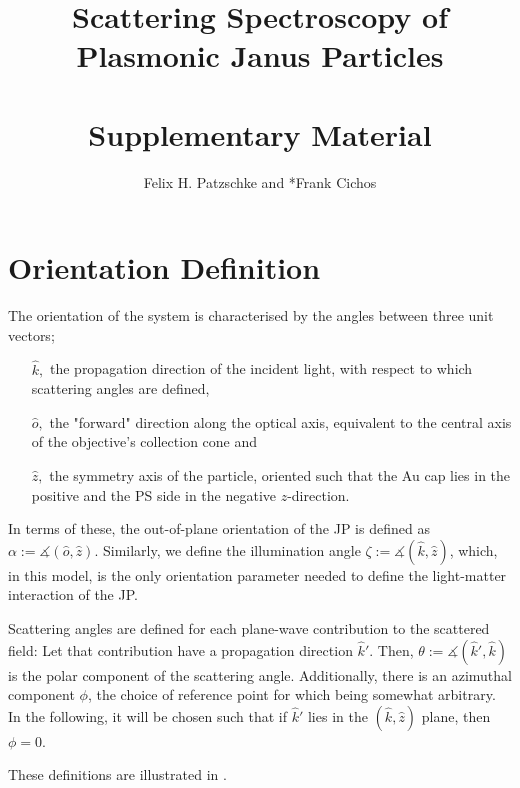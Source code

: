 \documentclass[10pt]{article}
\title{\sffamily\bfseries\color{MidnightBlue} Scattering Spectroscopy of\\Plasmonic Janus Particles\\\mbox{ }\\Supplementary Material}
\author{Felix H. Patzschke and *Frank Cichos}
\date{}
\newcommand{\reffig}[2]{\mbox{\sffamily{Figure \ref{#1}#2}}}
\begin{document}

\maketitle

\sectionfont{\sffamily\color{MidnightBlue}}  %
\subsectionfont{\sffamily\color{MidnightBlue}}  %



\section*{Orientation Definition}
The orientation of the system is characterised by the angles between three unit vectors;
\begin{itemize}
    \item[$\hat{k},$] the propagation direction of the incident light, with respect to which scattering angles are defined, 
    \item[$\hat{o},$] the "forward" direction along the optical axis, equivalent to the central axis of the objective's collection cone and
    \item[$\hat{z},$] the symmetry axis of the particle, oriented such that the Au cap lies in the positive and the PS side in the negative $z$-direction.
\end{itemize}
In terms of these, the out-of-plane orientation of the JP is defined as
$\alpha := \measuredangle( \hat{o}, \hat{z} )$.
Similarly, we define the illumination angle 
$\zeta := \measuredangle( \hat{k}, \hat{z} )$, 
which, in this model, is the only orientation parameter needed to define the light-matter interaction of the JP. 

Scattering angles are defined for each plane-wave contribution to the scattered field: 
Let that contribution have a propagation direction $\hat{k}'$. 
Then, \mbox{$\theta := \measuredangle( \hat{k}', \hat{k} )$} is the polar component of the scattering angle. 
Additionally, there is an azimuthal component $\phi$, the choice of reference point for which being somewhat arbitrary. 
In the following, it will be chosen such that if $\hat{k}'$ lies in the $(\hat{k},\hat{z})$ plane, then $\phi=0$.

These definitions are illustrated in \reffig{fig:vectors-and-angles}{}.  
\end{document}
